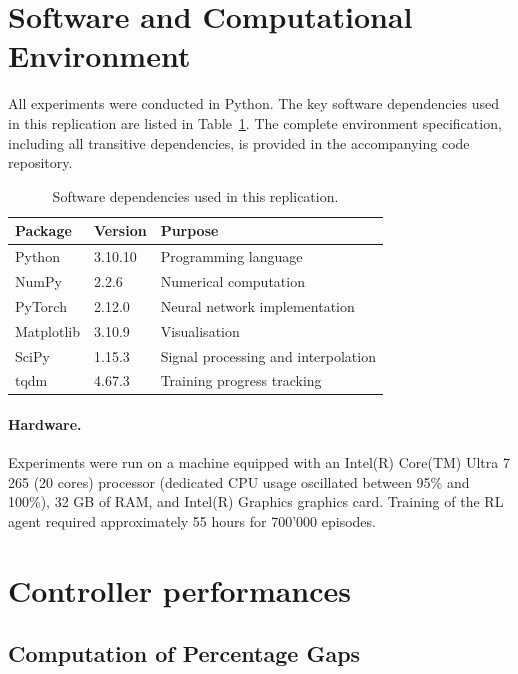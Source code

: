 \clearpage
\appendix

\section{Software and Computational Environment} \label{sec:a-Software}

All experiments were conducted in Python. The key software dependencies used
in this replication are listed in Table~\ref{tab:software}. The complete
environment specification, including all transitive dependencies, is provided in the accompanying code repository.

\begin{table}[h]
\centering
\caption{Software dependencies used in this replication.}
\label{tab:software}
\begin{tabular}{lll}
\hline
\textbf{Package} & \textbf{Version} & \textbf{Purpose} \\
\hline
Python      & 3.10.10 & Programming language \\
NumPy       & 2.2.6 & Numerical computation \\
PyTorch     & 2.12.0 & Neural network implementation \\
Matplotlib  & 3.10.9 & Visualisation \\
SciPy       & 1.15.3 & Signal processing and interpolation \\
tqdm        & 4.67.3 & Training progress tracking \\
\hline
\end{tabular}
\end{table}

\paragraph{Hardware.}
Experiments were run on a machine equipped with an Intel(R) Core(TM) Ultra 7 265 (20 cores) processor (dedicated CPU usage oscillated between 95\% and 100\%), 32 GB of RAM,
and Intel(R) Graphics graphics card. Training of the RL agent required approximately
55 hours for 700'000 episodes.

\section{Controller performances}\label{sec:a-controll_perf}

\subsection{Computation of Percentage Gaps}

